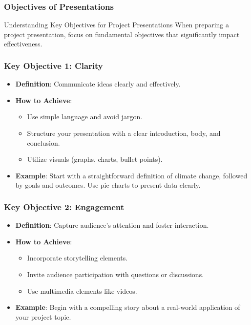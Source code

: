 \documentclass[aspectratio=169]{beamer}
\begin{document}
\begin{frame}[fragile]
  \frametitle{Objectives of Presentations}
  \begin{block}{Understanding Key Objectives for Project Presentations}
    When preparing a project presentation, focus on fundamental objectives that significantly impact effectiveness.
  \end{block}
\end{frame}

\begin{frame}[fragile]
  \frametitle{Key Objective 1: Clarity}
  \begin{itemize}
    \item \textbf{Definition}: Communicate ideas clearly and effectively.
    \item \textbf{How to Achieve}:
      \begin{itemize}
        \item Use simple language and avoid jargon.
        \item Structure your presentation with a clear introduction, body, and conclusion.
        \item Utilize visuals (graphs, charts, bullet points).
      \end{itemize}
    \item \textbf{Example}: Start with a straightforward definition of climate change, followed by goals and outcomes. Use pie charts to present data clearly.
  \end{itemize}
\end{frame}

\begin{frame}[fragile]
  \frametitle{Key Objective 2: Engagement}
  \begin{itemize}
    \item \textbf{Definition}: Capture audience's attention and foster interaction.
    \item \textbf{How to Achieve}:
      \begin{itemize}
        \item Incorporate storytelling elements.
        \item Invite audience participation with questions or discussions.
        \item Use multimedia elements like videos.
      \end{itemize}
    \item \textbf{Example}: Begin with a compelling story about a real-world application of your project topic.
  \end{itemize}
\end{frame}
\end{document}
